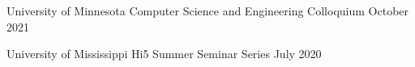 
\begin{cventries}
  \cventry
    {University of Minnesota} %
    {Computer Science and Engineering Colloquium} %
    {October 2021} %
    {} %
    {}
    \vspace{-0.15in}
    
  \cventry
    {University of Mississippi} %
    {Hi5 Summer Seminar Series} %
    {July 2020} %
    {} %
    {}
    \vspace{-0.15in}
\end{cventries}